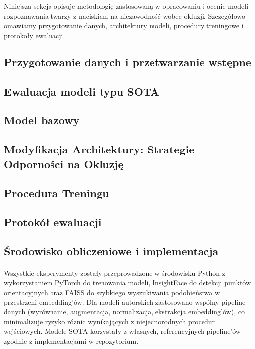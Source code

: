 Niniejsza sekcja opisuje metodologię zastosowaną w opracowaniu i ocenie modeli rozpoznawania twarzy z naciskiem na niezawodność wobec okluzji. Szczegółowo omawiamy przygotowanie danych, architektury modeli, procedury treningowe i protokoły ewaluacji.

\subsection{Przygotowanie danych i przetwarzanie wstępne}


\subsection{Ewaluacja modeli typu SOTA}


\subsection{Model bazowy}


\subsection{Modyfikacja Architektury: Strategie Odporności na Okluzję}


\subsection{Procedura Treningu}


\subsection{Protokół ewaluacji}


\subsection{Środowisko obliczeniowe i implementacja}
\paragraph{}Wszystkie eksperymenty zostały przeprowadzone w środowisku Python z wykorzystaniem PyTorch do trenowania modeli, InsightFace do detekcji punktów orientacyjnych oraz FAISS do szybkiego wyszukiwania podobieństwa w przestrzeni embedding'ów. Dla modeli autorskich zastosowano wspólny pipeline danych (wyrównanie, augmentacja, normalizacja, ekstrakcja embedding'ów), co minimalizuje ryzyko różnic wynikających z niejednorodnych procedur wejściowych. Modele SOTA korzystały z własnych, referencyjnych pipeline’ów zgodnie z implementacjami w repozytorium.

